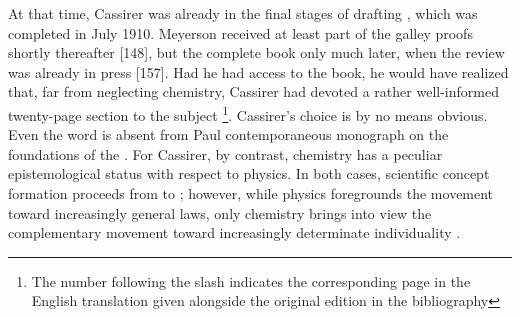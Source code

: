 \documentclass[submitted,12pt]{article}
\renewcommand{\SF}[2]{\citep[#1/#2]{Cassirer1910}}
\begin{document}

At that time, Cassirer was already in the final stages of drafting \SFt \citep{Cassirer1910}, which was completed in July 1910. Meyerson received at least part of the galley proofs shortly thereafter [148], but the complete book only much later, when the review was already in press [157]. Had he had access to the book, he would have realized that, far from neglecting chemistry, Cassirer had devoted a rather well-informed twenty-page section to the subject \SF{270--92}{203--20}\footnote{The number following the slash indicates the corresponding page in the English translation given alongside the original edition in the bibliography}. Cassirer's choice is by no means obvious. Even the word  is absent from Paul  contemporaneous  monograph on the foundations of the . For Cassirer, by contrast, chemistry has a peculiar epistemological status with respect to physics. In both cases, scientific concept formation proceeds from \SCs to \FCs; however, while physics foregrounds the movement toward increasingly general laws, only chemistry brings into view the complementary movement toward increasingly determinate individuality \citep[270--72/203--5; 289--93/217--21]{Cassirer1910}.   

\end{document}

